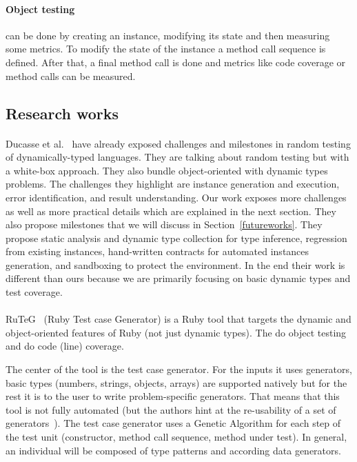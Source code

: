 \documentclass{llncs2e/llncs}
\begin{document}
\paragraph{Object testing} can be done by creating an instance, modifying its
state and then measuring some metrics. To modify the state of the instance a
method call sequence is defined. After that, a final method call is done and
metrics like code coverage or method calls can be measured.

\subsection{Research works}
\label{related_research}

\paragraph{} Ducasse et al.~\cite{ducasse2011challenges} have already exposed
challenges and milestones in random testing of dynamically-typed languages.
They are talking about random testing but with a white-box approach. They also
bundle object-oriented with dynamic types problems. The challenges they
highlight are instance generation and execution, error identification, and
result understanding. Our work exposes more challenges as well as more practical
details which are explained in the next section. They also propose milestones
that we will discuss in Section~\ref{futureworks}. They propose static analysis
and dynamic type collection for type inference, regression from existing
instances, hand-written contracts for automated instances generation, and
sandboxing to protect the environment. In the end their work is different than
ours because we are primarily focusing on basic dynamic types and test coverage.

\paragraph{} RuTeG~\cite{mairhofer2011search} (Ruby Test case Generator) is a
Ruby tool that targets the dynamic and object-oriented features of Ruby (not
just dynamic types). The do object testing and do code (line) coverage.

The center of the tool is the test case generator. For the inputs it uses
generators, basic types (numbers, strings, objects, arrays) are supported
natively but for the rest it is to the user to write problem-specific
generators. That means that this tool is not fully automated (but the authors
hint at the re-usability of a set of generators~\cite{feldt2002biomimetic}). The
test case generator uses a Genetic Algorithm for each step of the test unit
(constructor, method call sequence, method under test). In general, an
individual will be composed of type patterns and according data generators.
\end{document}
